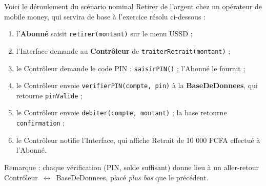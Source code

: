 \documentclass[11pt]{article}
\begin{document}
\begin{exemplebox}
Voici le déroulement du scénario nominal \og Retirer de l'argent \fg{} chez un opérateur de mobile money, qui servira de base à l'exercice résolu ci-dessous :
\begin{enumerate}
\item l'\textbf{Abonné} saisit \texttt{retirer(montant)} sur le menu USSD ;
\item l'Interface demande au \textbf{Contrôleur} de \texttt{traiterRetrait(montant)} ;
\item le Contrôleur demande le code PIN : \texttt{saisirPIN()} ; l'Abonné le fournit ;
\item le Contrôleur envoie \texttt{verifierPIN(compte, pin)} à la \textbf{BaseDeDonnees}, qui retourne \texttt{pinValide} ;
\item le Contrôleur envoie \texttt{debiter(compte, montant)} ; la base retourne \texttt{confirmation} ;
\item le Contrôleur notifie l'Interface, qui affiche \og Retrait de 10 000 FCFA effectué \fg{} à l'Abonné.
\end{enumerate}
Remarque : chaque vérification (PIN, solde suffisant) donne lieu à un aller-retour Contrôleur~$\leftrightarrow$~BaseDeDonnees, placé \emph{plus bas} que le précédent.
\end{exemplebox}
\end{document}
